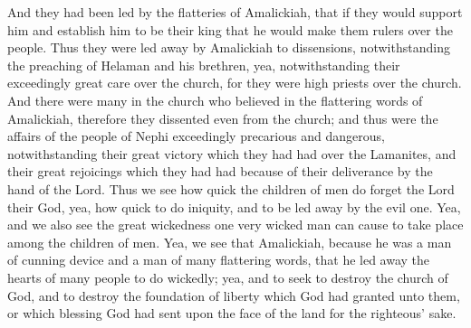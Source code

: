 And they had been led by the flatteries of Amalickiah, that if they would support him and establish him to be their king that he would make them rulers over the people.
\bverse \iffalse Thus they were led away by Amalickiah to dissensions, notwithstanding the preaching of Helaman and his brethren, yea, notwithstanding their exceedingly great care over the church, for they were high priests over the church. \fi
Thus they were led away by Amalickiah to dissensions, notwithstanding the preaching of Helaman and his brethren, yea, notwithstanding their exceedingly great care over the church, for they were high priests over the church.
\bverse \iffalse And there were many in the church who believed in the flattering words of Amalickiah, therefore they dissented even from the church; and thus were the affairs of the people of Nephi exceedingly precarious and dangerous, notwithstanding their great victory which they had had over the Lamanites, and their great rejoicings which they had had because of their deliverance by the hand of the Lord. \fi
And there were many in the church who believed in the flattering words of Amalickiah, therefore they dissented even from the church; and thus were the affairs of the people of Nephi exceedingly precarious and dangerous, notwithstanding their great victory which they had had over the Lamanites, and their great rejoicings which they had had because of their deliverance by the hand of the Lord.
\bverse \iffalse Thus we see how quick the children of men do forget the Lord their God, yea, how quick to do iniquity, and to be led away by the evil one. \fi
Thus we see how quick the children of men do forget the Lord their God, yea, how quick to do iniquity, and to be led away by the evil one.
\bverse \iffalse Yea, and we also see the great wickedness one very wicked man can cause to take place among the children of men. \fi
Yea, and we also see the great wickedness one very wicked man can cause to take place among the children of men.
\bverse \iffalse Yea, we see that Amalickiah, because he was a man of cunning device and a man of many flattering words, that he led away the hearts of many people to do wickedly; yea, and to seek to destroy the church of God, and to destroy the foundation of liberty which God had granted unto them, or which blessing God had sent upon the face of the land for the righteous' sake. \fi
Yea, we see that Amalickiah, because he was a man of cunning device and a man of many flattering words, that he led away the hearts of many people to do wickedly; yea, and to seek to destroy the church of God, and to destroy the foundation of liberty which God had granted unto them, or which blessing God had sent upon the face of the land for the righteous' sake.
